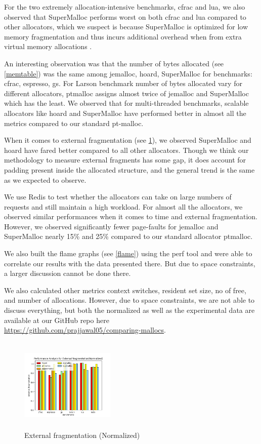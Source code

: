 \documentclass[sigplan,screen]{acmart}
\begin{document}
For the two extremely allocation-intensive benchmarks, cfrac and lua, we also observed that SuperMalloc performs worst on both cfrac and lua compared to other allocators, which we suspect is because SuperMalloc is optimized for low memory fragmentation and thus incurs additional overhead when from extra virtual memory allocations \cite{kuszmaul2015supermalloc}.

An interesting observation was that the number of bytes allocated (see \figurename{ \ref{memtable}}) was the same among jemalloc, hoard, SuperMalloc for benchmarks: cfrac, espresso, gs. For Larson benchmark number of bytes allocated vary for different allocators, ptmalloc assigns almost twice of jemalloc and SuperMalloc which has the least. We observed that for multi-threaded benchmarks, scalable allocators like hoard and SuperMalloc have performed better in almost all the metrics compared to our standard pt-malloc.

When it comes to external fragmentation (see \figurename{ \ref{ext_fragmentation}}), we observed SuperMalloc and hoard have fared better compared to all other allocators. Though we think our methodology to measure external fragments has some gap, it does account for padding present inside the allocated structure, and the general trend is the same as we expected to observe.

We use Redis to test whether the allocators can take on large numbers of requests and still maintain a high workload.  For almost all the allocators, we observed similar performances when it comes to time and external fragmentation. However, we observed significantly fewer page-faults for jemalloc and SuperMalloc nearly  15\% and 25\% compared to our standard allocator ptmalloc. 

We also built the flame graphs (see \figurename{ \ref{flame}}) using the perf tool and were able to correlate our results with the data presented there. But due to space constraints, a larger discussion cannot be done there.

We also calculated other metrics context switches, resident set size, no of free, and number of allocations. However, due to space constraints, we are not able to discuss everything, but both the normalized as well as the experimental data are available at our GitHub repo here \\ \href{https://github.com/prajjawal05/comparing-mallocs}{https://github.com/prajjawal05/comparing-mallocs}.


\begin{figure}
\centering
\includegraphics[width=0.4\textwidth, height=4.5cm]{External fragmentation(Normalized)_plot.png}
\caption{External fragmentation (Normalized)}
\label{ext_fragmentation}
\end{figure}
\end{document}
